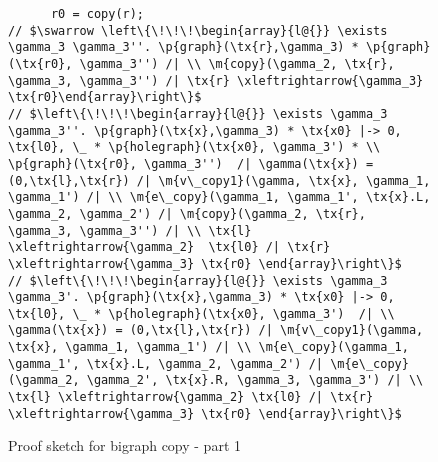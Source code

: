 \documentclass[acmsmall,review,anonymous]{acmart}\settopmatter{printfolios=true,printccs=false,printacmref=false}
\newcommand{\tx}[1]{\text{#1}}
\newcommand{\p}[1]{\ensuremath{\mathsf{#1}}} \newcommand{\m}[1]{\ensuremath{\mathit{#1}}} \newcommand{\ma}[1]{\ensuremath{\mathcal{#1}}} \let\ramify\lightning
\begin{document}
\begin{figure}
\begin{lstlisting}
      r0 = copy(r);
// $\swarrow \left\{\!\!\!\begin{array}{l@{}} \exists \gamma_3 \gamma_3''. \p{graph}(\tx{r},\gamma_3) * \p{graph}(\tx{r0}, \gamma_3'') /| \\ \m{copy}(\gamma_2, \tx{r}, \gamma_3, \gamma_3'') /| \tx{r} \xleftrightarrow{\gamma_3} \tx{r0}\end{array}\right\}$
// $\left\{\!\!\!\begin{array}{l@{}} \exists \gamma_3 \gamma_3''. \p{graph}(\tx{x},\gamma_3) * \tx{x0} |-> 0, \tx{l0}, \_ * \p{holegraph}(\tx{x0}, \gamma_3') * \\ \p{graph}(\tx{r0}, \gamma_3'')  /| \gamma(\tx{x}) = (0,\tx{l},\tx{r}) /| \m{v\_copy1}(\gamma, \tx{x}, \gamma_1, \gamma_1') /| \\ \m{e\_copy}(\gamma_1, \gamma_1', \tx{x}.L, \gamma_2, \gamma_2') /| \m{copy}(\gamma_2, \tx{r}, \gamma_3, \gamma_3'') /| \\ \tx{l} \xleftrightarrow{\gamma_2}  \tx{l0} /| \tx{r} \xleftrightarrow{\gamma_3} \tx{r0} \end{array}\right\}$
// $\left\{\!\!\!\begin{array}{l@{}} \exists \gamma_3 \gamma_3'. \p{graph}(\tx{x},\gamma_3) * \tx{x0} |-> 0, \tx{l0}, \_ * \p{holegraph}(\tx{x0}, \gamma_3')  /| \\ \gamma(\tx{x}) = (0,\tx{l},\tx{r}) /| \m{v\_copy1}(\gamma, \tx{x}, \gamma_1, \gamma_1') /| \\ \m{e\_copy}(\gamma_1, \gamma_1', \tx{x}.L, \gamma_2, \gamma_2') /| \m{e\_copy}(\gamma_2, \gamma_2', \tx{x}.R, \gamma_3, \gamma_3') /| \\ \tx{l} \xleftrightarrow{\gamma_2} \tx{l0} /| \tx{r} \xleftrightarrow{\gamma_3} \tx{r0} \end{array}\right\}$
  \end{lstlisting}
\caption{Proof sketch for bigraph copy - part 1}
\label{fig:copy-part1}
\end{figure}

\newpage 
\end{document}
